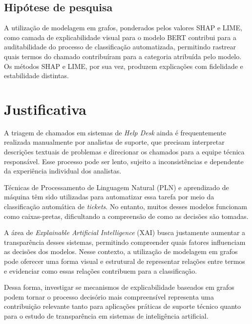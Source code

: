 \documentclass[
    12pt,                %
    openright,           %
    oneside,             %
    a4paper,             %
    english,             %
    brazil               %
]{abntex2}
\begin{document}
\subsection{Hipótese de pesquisa}
\label{sec:hipotese_pesquisa}

A utilização de modelagem em grafos, ponderados pelos valores SHAP e LIME, 
como camada de explicabilidade visual para o modelo BERT contribui para a 
auditabilidade do processo de classificação automatizada, permitindo rastrear 
quais termos do chamado contribuíram para a categoria atribuída pelo modelo. 
Os métodos SHAP e LIME, por sua vez, produzem explicações com fidelidade e estabilidade distintas.

\section{Justificativa}
\label{sec:justificativa}

A triagem de chamados em sistemas de \textit{Help Desk} ainda é frequentemente realizada manualmente por analistas de suporte, que precisam interpretar descrições textuais de problemas e direcionar os chamados para a equipe técnica responsável. Esse processo pode ser lento, sujeito a inconsistências e dependente da experiência individual dos analistas.

Técnicas de Processamento de Linguagem Natural (PLN) e aprendizado de máquina têm sido utilizadas para automatizar essa tarefa por meio da classificação automática de \textit{tickets}. No entanto, muitos desses modelos funcionam como caixas-pretas, dificultando a compreensão de como as decisões são tomadas.

A área de \textit{Explainable Artificial Intelligence} (XAI) busca justamente aumentar a transparência desses sistemas, permitindo compreender quais fatores influenciam as decisões dos modelos. Nesse contexto, a utilização de modelagem em grafos pode oferecer uma forma visual e estrutural de representar relações entre termos e evidenciar como essas relações contribuem para a classificação.

Dessa forma, investigar se mecanismos de explicabilidade baseados em grafos podem tornar o processo decisório mais compreensível representa uma contribuição relevante tanto para aplicações práticas de suporte técnico quanto para o estudo de transparência em sistemas de inteligência artificial.

\end{document}
